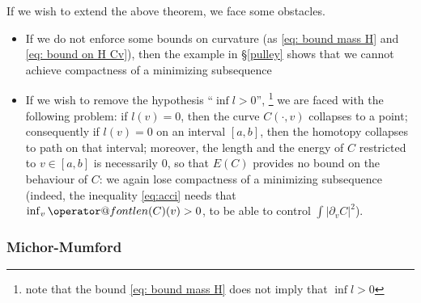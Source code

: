 \documentclass[twoside,a4paper,english]{article}
\makeatletter
\def\derpar#1{\partial_{#1}}
\def\len{\mathop{\operator@font len}\nolimits}
\makeatother
\begin{document}
\begin{Remark}\label{rem: extend thm}
  If we wish to extend the above theorem, we face some obstacles.
  \begin{itemize}
  \item If we do not enforce some  bounds on curvature
    (as \eqref{eq: bound mass H} and
    \eqref{eq: bound on H Cv}), then
    the example in \S\ref{pulley} shows that we cannot achieve
    compactness of a minimizing subsequence 

  \item 
  If we wish to remove the hypothesis ``$\inf l > 0$'',%
\footnote{note that the bound \eqref{eq: bound mass H}
  does not imply that $\inf l > 0$}
  we are faced with the following problem: if $l(v)=0$, then 
  the curve $C(\cdot,v)$ collapses to a point; consequently
  if $l(v)=0$ on an interval $[a,b]$,
  then the homotopy collapses to path on that
  interval; moreover, the length and the energy of $C$
  restricted to $v\in[a,b]$ is necessarily $0$, so that $E(C)$ provides
  no bound on the behaviour of $C$: we again lose 
  compactness of a minimizing subsequence
  (indeed, the inequality 
  \eqref{eq:acci} needs that  $\inf_v\len(C)(v)>0$, to be able to
  control $\int |\derpar v C|^2$).
  \end{itemize}
\end{Remark}

\subsubsection{Michor-Mumford}
\label{sec: discuss MM}
\end{document}
